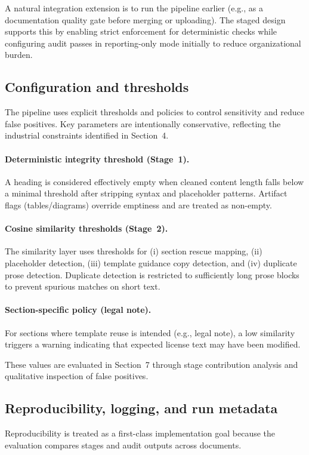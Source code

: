 A natural integration extension is to run the pipeline earlier (e.g., as a documentation quality gate before merging or uploading). The staged design supports this by enabling strict enforcement for deterministic checks while configuring audit passes in reporting-only mode initially to reduce organizational burden.

\subsection{Configuration and thresholds}
The pipeline uses explicit thresholds and policies to control sensitivity and reduce false positives. Key parameters are intentionally conservative, reflecting the industrial constraints identified in Section~4.

\paragraph{Deterministic integrity threshold (Stage~1).}
A heading is considered effectively empty when cleaned content length falls below a minimal threshold after stripping syntax and placeholder patterns. Artifact flags (tables/diagrams) override emptiness and are treated as non-empty.

\paragraph{Cosine similarity thresholds (Stage~2).}
The similarity layer uses thresholds for (i) section rescue mapping, (ii) placeholder detection, (iii) template guidance copy detection, and (iv) duplicate prose detection. Duplicate detection is restricted to sufficiently long prose blocks to prevent spurious matches on short text.

\paragraph{Section-specific policy (legal note).}
For sections where template reuse is intended (e.g., legal note), a low similarity triggers a warning indicating that expected license text may have been modified.

These values are evaluated in Section~7 through stage contribution analysis and qualitative inspection of false positives.

\subsection{Reproducibility, logging, and run metadata}
Reproducibility is treated as a first-class implementation goal because the evaluation compares stages and audit outputs across documents.

